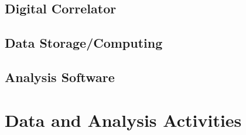 \documentclass[12pt]{amsart}
\begin{document}


\subsection{Digital Correlator}
\label{sec:digital_correlator}


\subsection{Data Storage/Computing}



\subsection{Analysis Software}


\section{Data and Analysis Activities}
\label{sec:analysis}
\end{document}
